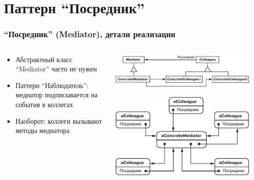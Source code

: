 \documentclass[xetex,mathserif,serif]{beamer}
\begin{document}
	\section{Паттерн ``Посредник''}

	\begin{frame}
		\frametitle{``Посредник'' (Mediator), детали реализации}
		\begin{columns}
			\begin{column}{0.5\textwidth}
				\begin{itemize}
					\item Абстрактный класс ``Mediator'' часто не нужен
					\item Паттерн ``Наблюдатель'': медиатор подписывается на события в коллегах
					\item Наоборот: коллеги вызывают методы медиатора
				\end{itemize}
			\end{column}
			\begin{column}{0.5\textwidth}
				\begin{center}
					\includegraphics[width=\textwidth]{mediatorClasses.png}

					\vspace{1cm}

					\includegraphics[width=\textwidth]{mediatorObjects.png}
				\end{center}
			\end{column}
		\end{columns}
	\end{frame}
\end{document}
